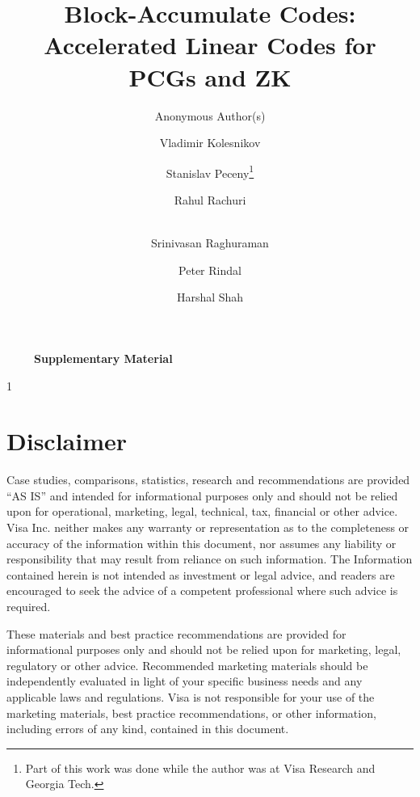 \documentclass[]{llncs}
\title{Block-Accumulate Codes: Accelerated Linear Codes for PCGs and ZK}
\author{Anonymous Author(s)}
\institute{Anonymous Institution}
\author{}
\institute{}
\author{Vladimir Kolesnikov\inst{1} \and Stanislav Peceny\inst{2}\thanks{Part of this work was done while the author was at Visa Research and Georgia Tech.} \and
Rahul Rachuri\inst{3} \and \\ Srinivasan Raghuraman\inst{4} \and  Peter Rindal\inst{5} \and Harshal Shah\inst{3}}
\institute{Georgia Institute of Technology \and Stealth Software Technologies, Inc. \and Visa Research \and Visa Research and MIT \and Category Labs}
\date{}
\def\submission{0}
\begin{document}
\maketitle









%




%


\newpage



\newpage

{\LARGE \bf \verb+    + Supplementary Material}

\begin{appendix}
  
  
  
  
  
  
  
  

  \if\submission1
  \else

    \newpage
    \section*{Disclaimer}
    Case studies, comparisons, statistics, research and recommendations are provided “AS IS” and intended for informational purposes only and should not be relied upon for operational, marketing, legal, technical, tax, financial or other advice.  Visa Inc. neither makes any warranty or representation as to the completeness or accuracy of the information within this document, nor assumes any liability or responsibility that may result from reliance on such information.  The Information contained herein is not intended as investment or legal advice, and readers are encouraged to seek the advice of a competent professional where such advice is required.

    These materials and best practice recommendations are provided for informational purposes only and should not be relied upon for marketing, legal, regulatory or other advice. Recommended marketing materials should be independently evaluated in light of your specific business needs and any applicable laws and regulations. Visa is not responsible for your use of the marketing materials, best practice recommendations, or other information, including errors of any kind, contained in this document.
  \fi

\end{appendix}
\end{document}
